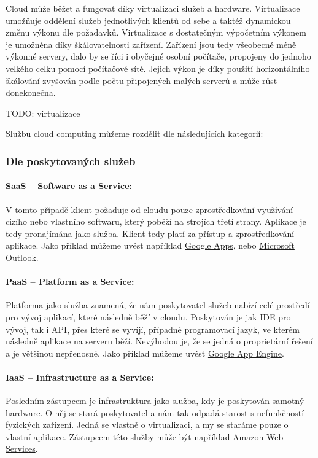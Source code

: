 Cloud může běžet a fungovat díky virtualizaci služeb a hardware. Virtualizace umožňuje oddělení služeb jednotlivých klientů od sebe a taktéž dynamickou změnu výkonu dle požadavků. Virtualizace s dostatečným výpočetním výkonem je umožněna díky škálovatelnosti zařízení. Zařízení jsou tedy všeobecně méně výkonné servery, dalo by se říci i obyčejné osobní počítače, propojeny do jednoho velkého celku pomocí počítačové sítě. Jejich výkon je díky použití horizontálního škálování zvyšován podle počtu připojených malých serverů a může růst donekonečna. 

TODO: virtualizace


Službu cloud computing můžeme rozdělit dle následujících kategorií:
\subsubsection{Dle poskytovaných služeb}

\paragraph{SaaS -- Software as a Service:}
V tomto případě klient požaduje od cloudu pouze zprostředkování využívání cizího nebo vlastního softwaru, který poběží na strojích třetí strany. Aplikace je tedy pronajímána jako služba. Klient tedy platí za přístup a zprostředkování aplikace. Jako příklad můžeme uvést například \href{apps.google.com}{Google Apps}, nebo \href{http://domains.live.com}{Microsoft Outlook}.

\paragraph{PaaS -- Platform as a Service:}
Platforma jako služba znamená, že nám poskytovatel služeb nabízí celé prostředí pro vývoj aplikací, které následně běží v cloudu. Poskytován je jak IDE pro vývoj, tak i API, přes které se vyvíjí, případně programovací jazyk, ve kterém následně aplikace na serveru běží. Nevýhodou je, že se jedná o proprietární řešení a je většinou nepřenosné. Jako příklad můžeme uvést \href{appengine.google.com}{Google App Engine}.

\paragraph{IaaS -- Infrastructure as a Service:}
Posledním zástupcem je infrastruktura jako služba, kdy je poskytován samotný hardware. O něj se stará poskytovatel a nám tak odpadá starost s nefunkčností fyzických zařízení. Jedná se vlastně o virtualizaci, a my se staráme pouze o vlastní aplikace. Zástupcem této služby může být například \href{http://aws.amazon.com/}{Amazon Web Services}.

